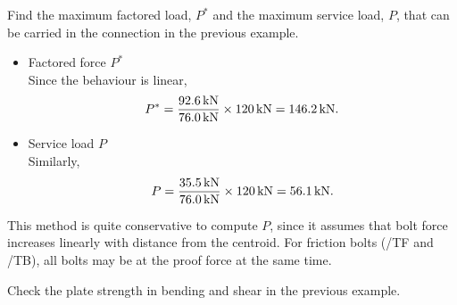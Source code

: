 \begin{exmp}
Find the maximum factored load, $P^*$ and the maximum service load, $P$, that can be carried in the connection in the previous example.
\end{exmp}
\begin{solution}
\begin{itemize}
\item Factored force $P^*$\\Since the behaviour is linear,
\begin{gather*}
P^*=\dfrac{\SI{92.6}{\kilo\newton}}{\SI{76.0}{\kilo\newton}}\times\SI{120}{\kilo\newton}=\SI{146.2}{\kilo\newton}.
\end{gather*}
\item Service load $P$\\Similarly,
\begin{gather*}
P=\dfrac{\SI{35.5}{\kilo\newton}}{\SI{76.0}{\kilo\newton}}\times\SI{120}{\kilo\newton}=\SI{56.1}{\kilo\newton}.
\end{gather*}
\end{itemize}
This method is quite conservative to compute $P$, since it assumes that bolt force increases linearly with distance from the centroid.
For friction bolts (/TF and /TB), all bolts may be at the proof force at the same time.
\end{solution}
\begin{exmp}
Check the plate strength in bending and shear in the previous example.
\end{exmp}
